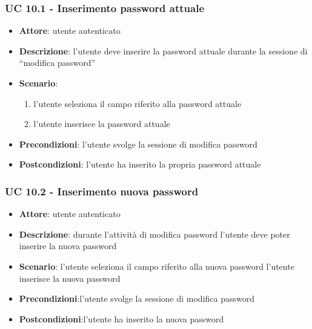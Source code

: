 \subsubsection{UC 10.1 - Inserimento password attuale} 
\begin{itemize}
    \item \textbf{Attore}: utente autenticato
    \item \textbf{Descrizione}: l’utente deve inserire la password attuale durante la sessione di “modifica password”
    \item \textbf{Scenario}: 
        \begin{enumerate}
            \item l’utente seleziona il campo riferito alla password attuale
            \item l’utente inserisce la password attuale
        \end{enumerate}
    \item \textbf{Precondizioni}: l’utente svolge la sessione di modifica password
    \item \textbf{Postcondizioni}: l’utente ha inserito la propria password attuale
\end{itemize}

\subsubsection{UC 10.2 - Inserimento nuova password}
\begin{itemize}
    \item \textbf{Attore}: utente autenticato
    \item \textbf{Descrizione}: durante l’attività di modifica password l’utente deve poter inserire la nuova password
    \item \textbf{Scenario}: 
    l’utente seleziona il campo riferito alla nuova password
    l’utente inserisce la nuova password 
    \item \textbf{Precondizioni}:l’utente svolge la sessione di modifica password
    \item \textbf{Postcondizioni}:l’utente ha inserito la nuova password 
\end{itemize}


